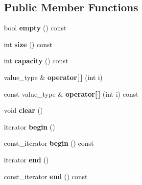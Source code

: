\subsection*{Public Member Functions}
\begin{DoxyCompactItemize}
\item 
\mbox{\label{class_im_vector_aa53e48a5272f4bad1099368769514ff1}} 
bool {\bfseries empty} () const
\item 
\mbox{\label{class_im_vector_a8c903ecb1aaee0601b6a8ad835a4a435}} 
int {\bfseries size} () const
\item 
\mbox{\label{class_im_vector_ac17681baa8b9b5cd97e556da29f9ef73}} 
int {\bfseries capacity} () const
\item 
\mbox{\label{class_im_vector_a59a3eeadda07579727de93ca6844b91e}} 
value\+\_\+type \& {\bfseries operator\mbox{[}$\,$\mbox{]}} (int i)
\item 
\mbox{\label{class_im_vector_ab97c3f6f1943602e36afb593c6f03ff1}} 
const value\+\_\+type \& {\bfseries operator\mbox{[}$\,$\mbox{]}} (int i) const
\item 
\mbox{\label{class_im_vector_ae2d401b4ec5f1113cdb8edb5a61a38f7}} 
void {\bfseries clear} ()
\item 
\mbox{\label{class_im_vector_a300a8b559cd87a78063046ef81151bce}} 
iterator {\bfseries begin} ()
\item 
\mbox{\label{class_im_vector_ac72cd4105b5c6a7f76157df945b39d4c}} 
const\+\_\+iterator {\bfseries begin} () const
\item 
\mbox{\label{class_im_vector_a947fbc3b1d8c1997e51ae6caab440379}} 
iterator {\bfseries end} ()
\item 
\mbox{\label{class_im_vector_a06efa87357864d1c130f0f400eeccf8d}} 
const\+\_\+iterator {\bfseries end} () const
\item 
\mbox{\label{class_im_vector_a5b0108d6b1a4a11609723f8305fb9011}} 

\end{DoxyCompactItemize}
